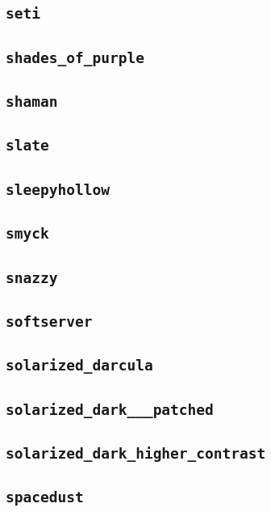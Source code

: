\subsection{\texttt{seti}}
\newpage
\subsection{\texttt{shades\_of\_purple}}
\newpage
\subsection{\texttt{shaman}}
\newpage
\subsection{\texttt{slate}}
\newpage
\subsection{\texttt{sleepyhollow}}
\newpage
\subsection{\texttt{smyck}}
\newpage
\subsection{\texttt{snazzy}}
\newpage
\subsection{\texttt{softserver}}
\newpage
\subsection{\texttt{solarized\_darcula}}
\newpage
\subsection{\texttt{solarized\_dark\_\_\_patched}}
\newpage
\subsection{\texttt{solarized\_dark\_higher\_contrast}}
\newpage
\subsection{\texttt{spacedust}}
\newpage
